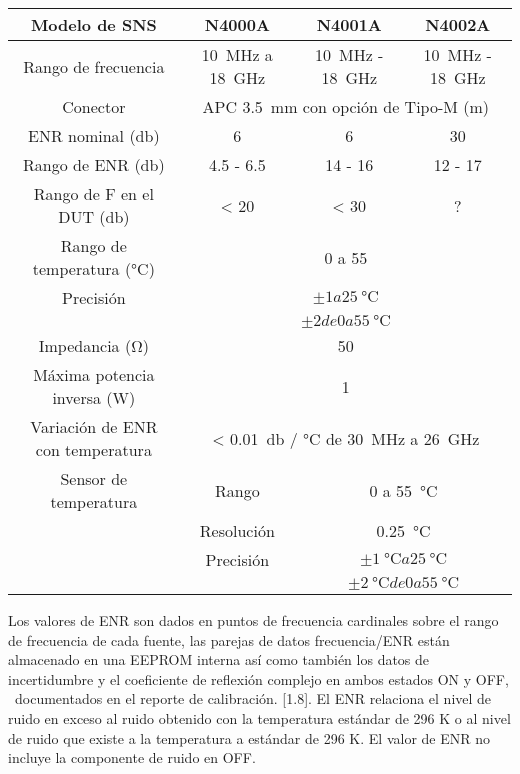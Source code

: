 	\begin{table}[h!]
		\centering
		\begin{tabular}{cccc}
			\toprule
			Modelo de SNS		&	N4000A		&	N4001A		&	N4002A	\\
			\midrule
			Rango de frecuencia	&	\SI{10}{\mega\hertz} a \SI{18}{\giga\hertz} & \SI{10}{\mega\hertz} - \SI{18}{\giga\hertz} & \SI{10}{\mega\hertz} - \SI{18}{\giga\hertz} \\
			\midrule
			Conector			&	\multicolumn{3}{c}{APC \SI{3.5}{\milli\meter} con opción de Tipo-M (m)}	\\
			\midrule
			ENR nominal	(\si{\decibel})		&	6 		&	6		&	30		\\
			\midrule
			Rango de ENR (\si{\decibel}) 	& 4.5 - 6.5 & 14 - 16	& 12 - 17 	\\
			\midrule
			Rango de F en el DUT (\si{\decibel}) & < 20		& < 30 		& 	?	 \\
			\midrule
			Rango de temperatura (\si{\degreeCelsius}) 	& \multicolumn{3}{c}{0 a 55} \\
			\midrule
			Precisión 				& \multicolumn{3}{c}{$\pm 1 a \SI{25}{\degreeCelsius}$} \\
									& \multicolumn{3}{c}{$\pm 2 de 0 a \SI{55}{\degreeCelsius}$} \\
			\midrule
			Impedancia (\si{\ohm})  & \multicolumn{3}{c}{ 50 } \\
			\midrule
			Máxima potencia inversa (\si{\watt}) 	& \multicolumn{3}{c}{1} \\
			\midrule
			Variación de ENR con temperatura 		& \multicolumn{3}{c}{ < \SI{0.01}{\decibel} / \si{\degreeCelsius} de \SI{30}{\mega\hertz} a \SI{26}{\giga\hertz}} \\
			\midrule
			Sensor de temperatura 	& Rango 		& \multicolumn{2}{c}{0 a \SI{55}{\degreeCelsius}} \\
									& Resolución 	& \multicolumn{2}{c}{\SI{0.25}{\degreeCelsius}} \\
									& Precisión 	& \multicolumn{2}{c}{$\pm \SI{1}{\degreeCelsius} a \SI{25}{\degreeCelsius}$} \\
									&				& \multicolumn{2}{c}{$\pm \SI{2}{\degreeCelsius} de 0 a \SI{55}{\degreeCelsius}$} \\ 
			\bottomrule									
		\end{tabular}
	\end{table}	
	


	Los valores de ENR son dados en puntos de frecuencia cardinales sobre el rango de frecuencia de cada fuente, las parejas de datos frecuencia/ENR están almacenado en una EEPROM interna así como también los datos de incertidumbre y el coeficiente de reflexión complejo en ambos estados ON y OFF, \ documentados en el reporte de calibración. [1.8]. El ENR relaciona el nivel de ruido en exceso al ruido obtenido con la temperatura estándar de 296 K o al nivel de ruido que existe a la temperatura a estándar de 296 K. El valor de ENR no incluye la componente de ruido en OFF. 
	

